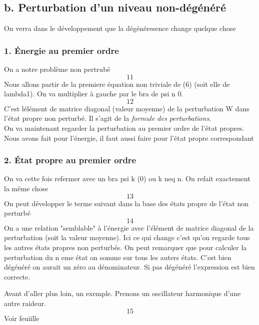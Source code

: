 	\subsection{b. Perturbation d'un niveau non-dégénéré}
	On verra dans le développement que la dégénéresence change quelque 
	chose
	
		\subsubsection{1. Énergie au premier ordre}
		On a notre problème non pertrubé
		\begin{equation}
		11
		\end{equation}
		Nous allons partir de la premiere équation non triviale de (6) (soit 
		elle de lambda1). On va multiplier à gauche par le bra de psi n 0.
		\begin{equation}
		12
		\end{equation}
		C'est lélément de matrice diagonal (valeur moyenne) de la perturbation
		W dans l'état propre non perturbé.  Il s'agit de la \textit{formule 
		des perturbations}.\\
		
		On va maintenant regarder la perturbation au premier ordre de l'état 
		propres. Nous avons fait pour l'énergie, il faut aussi faire pour 
		l'état propre correspondant
		
		\subsubsection{2. État propre au premier ordre}
		On va cette fois refermer avec un bra psi k (0) ou k neq n. On refait 
		exactement la même chose
		\begin{equation}
		13
		\end{equation}
		On peut développer le terme suivant dans la base des états propre 
		de l'état non perturbé
		\begin{equation}
		14
		\end{equation}
		On a une relation "semblable" à l'énergie avec l'élément de matrice 
		diagonal de la perturbation (soit la valeur moyenne). Ici ce qui 
		change c'est qu'on regarde tous les autres états propres non 
		perturbés.  On peut remarquer que pour calculer la perturbation du 
		n eme état on somme sur tous les auters états. C'est bien dégénéré 
		on aurait un zéro au dénominateur. Si pas dégénéré l'expression est 
		bien correcte.
		
		
		Avant d'aller plus loin, un exemple. Prenons un oscillateur 
		harmonique d'une autre raideur.
		\begin{equation}
		15
		\end{equation}
		Voir feuiille
		
